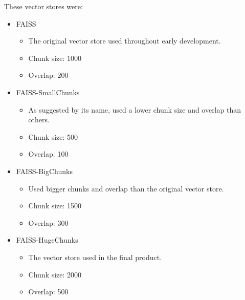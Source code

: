 \para These vector stores were:
\begin{itemize}
    \item FAISS \begin{itemize}
        \item The original vector store used throughout early development.
        \item Chunk size: 1000
        \item Overlap: 200
    \end{itemize}
    \item FAISS-SmallChunks \begin{itemize}
        \item As suggested by its name, used a lower chunk size and overlap than others.
        \item Chunk size: 500
        \item Overlap: 100 
    \end{itemize}
    \item FAISS-BigChunks \begin{itemize}
        \item Used bigger chunks and overlap than the original vector store.
        \item Chunk size: 1500
        \item Overlap: 300
    \end{itemize}
    \item FAISS-HugeChunks \begin{itemize}
        \item The vector store used in the final product.
        \item Chunk size: 2000
        \item Overlap: 500
    \end{itemize}
\end{itemize}